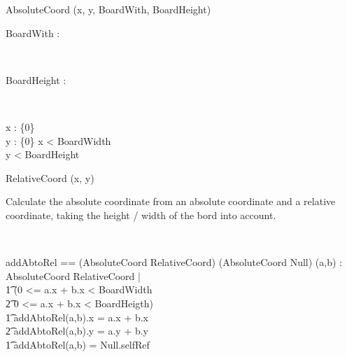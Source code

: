 \begin{class}{AbsoluteCoord}
\upharpoonright (x, y, BoardWith, BoardHeight) \\
\begin{axdef}
BoardWith : \nat
\end{axdef} \\
\begin{axdef}
BoardHeight : \nat
\end{axdef} \\
\begin{state}
x : \nat \cup \{0\} \\
y : \nat \cup \{0\}
\where
x < BoardWidth \\
y < BoardHeight
\end{state}
\end{class}

\begin{class}{RelativeCoord}
\upharpoonright (x, y) \\
\end{class}

\begin{classcom}
Calculate the absolute coordinate from an absolute coordinate and a relative coordinate, taking the height / width of the bord into account.
\end{classcom} \\
\begin{axdef}
addAbtoRel == (AbsoluteCoord \cross RelativeCoord) \rightarrow (AbsoluteCoord \union Null)
\where
\forall (a,b) : AbsoluteCoord \cross RelativeCoord | \\ \t1
\IF (0 <= a.x + b.x < BoardWidth \\ \t2
0 <= a.x + b.x < BoardHeigth) \\ \t1
\THEN
addAbtoRel(a,b).x = a.x + b.x \\ \t2
addAbtoRel(a,b).y = a.y + b.y \\ \t1
\ELSE addAbtoRel(a,b) = Null.selfRef
\end{axdef}

